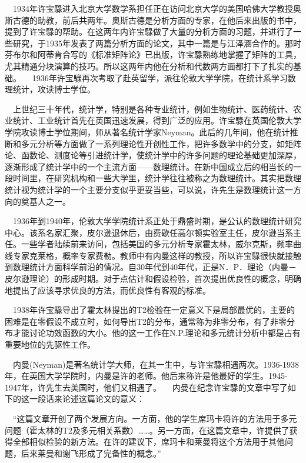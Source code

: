 $\quad$1934年许宝騄进入北京大学数学系担任正在访问北京大学的美国哈佛大学教授奥斯古德的助教，前后共两年。奥斯古德是分析方面的专家，在他后来出版的书中，提到了许宝騄的帮助。在这两年内许宝騄做了大量的分析方面的习题，并进行了一些研究，于1935年发表了两篇分析方面的论文，其中一篇是与江泽涵合作的。那时芬布尔和阿蒂肯合写的《标准矩阵论》已出版，许宝騄熟练地掌握了矩阵的工具，尤其精通分块演算的技巧。所以这两年内他在分析和代数两方面都打下了扎实的基础。
$\quad$1936年许宝騄再次考取了赴英留学，派往伦敦大学学院，在统计系学习数理统计，攻读博士学位。

$\quad$上世纪三十年代，统计学，特别是各种专业统计，例如生物统计、医药统计、农业统计、工业统计首先在英国迅速发展，得到广泛的应用。许宝騄在英国伦敦大学学院攻读博士学位期间，师从著名统计学家Neyman。此后的几年间，他在统计推断和多元分析等方面做了一系列理论性开创性工作，把许多数学中的分支，如矩阵论、函数论、测度论等引进统计学，使统计学中的许多问题的理论基础更加深厚，逐渐形成了统计学中的一个主流方面——数理统计。在新中国成立后的相当长的一段时间里，在研究机构和一些大学里，统计学往往被称之为数理统计。其实把数理统计视为统计学的一个主要分支似乎更妥当些，可以说，许先生是数理统计这一方向的奠基人之一。

$\quad$1936年到1940年，伦敦大学学院统计系正处于鼎盛时期，是公认的数理统计研究中心。该系名家汇聚，皮尔逊退休后，由费歇任高尔顿实验室主任，皮尔逊当系主任。一些学者陆续前来访问，包括美国的多元分析专家霍太林，威尔克斯，频率曲线专家克莱格，概率专家费勒。教师中有内曼这样的教授，所以许宝騄很快就接触到数理统计方面科学前沿的情况。自30年代到40年代，正是N．P．理论（内曼－皮尔逊理论）的形成时期。对于点估计和假设检验，首次提出优良性的概念，明确地提出了应该寻求优良的方法，而优良性有客观的标准。

$\quad$1938年许宝騄导出了霍太林提出的T2检验在一定意义下是局部最优的，主要的困难是在零假设不成立时，如何导出T2的分布，通常称为非零分布，有了非零分布才能讨论功效函数的大小。他的这一工作在N.P.理论和多元统计分析中都是占有重要地位的先驱性工作。

$\quad$内曼(Neyman)是著名统计学大师，在其一生中，与许宝騄相遇两次。1936-1938年，在英国大学学院时，内曼是许的老师。他后来称许是他最好的学生。1945-1947年，许先生去美国时，他们又相遇了。
$\quad$内曼在纪念许宝騄的文章中写了如下的这一段话来论述这篇论文的意义： 

$\quad$“这篇文章开创了两个发展方向。一方面，他的学生席玛卡将许的方法用于多元问题（霍太林的T2及多元相关系数）……。另一方面，在这篇文章中，许提供了获得全部相似检验的新方法。在许的建议下，席玛卡和莱曼将这个方法用于其他问题，后来莱曼和谢飞形成了完备性的概念。” 

